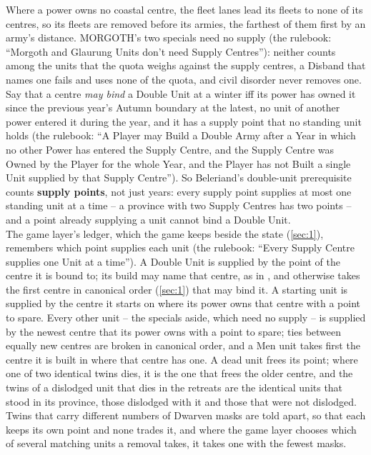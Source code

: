 \documentclass[12pt,a4paper]{article}
\begin{document}
Where a power owns no coastal centre, the fleet lanes lead its fleets to none of its centres, so its fleets are removed before its armies, the farthest of them first by an army's distance.
MORGOTH's two specials need no supply (the rulebook: ``Morgoth and Glaurung Units don't need Supply Centres''): neither counts among the units that the quota weighs against the supply centres, a Disband that names one fails and uses none of the quota, and civil disorder never removes one.\\
Say that a centre \emph{may bind} a Double Unit at a winter iff its power has owned it since the previous year's Autumn boundary at the latest, no unit of another power entered it during the year, and it has a supply point that no standing unit holds (the rulebook: ``A Player may Build a Double Army after a Year in which no other Power has entered the Supply Centre, and the Supply Centre was Owned by the Player for the whole Year, and the Player has not Built a single Unit supplied by that Supply Centre'').
So Beleriand's double-unit prerequisite counts \textbf{supply points}, not just years: every supply point supplies at most one standing unit at a time -- a province with two Supply Centres has two points -- and a point already supplying a unit cannot bind a Double Unit.\\
The game layer's ledger, which the game keeps beside the state (\cref{sec:1}), remembers which point supplies each unit (the rulebook: ``Every Supply Centre supplies one Unit at a time'').
A Double Unit is supplied by the point of the centre it is bound to; its build may name that centre, as in , and otherwise takes the first centre in canonical order (\cref{sec:1}) that may bind it.
A starting unit is supplied by the centre it starts on where its power owns that centre with a point to spare.
Every other unit -- the specials aside, which need no supply -- is supplied by the newest centre that its power owns with a point to spare; ties between equally new centres are broken in canonical order, and a Men unit takes first the centre it is built in where that centre has one.
A dead unit frees its point; where one of two identical twins dies, it is the one that frees the older centre, and the twins of a dislodged unit that dies in the retreats are the identical units that stood in its province, those dislodged with it and those that were not dislodged.
Twins that carry different numbers of Dwarven masks are told apart, so that each keeps its own point and none trades it, and where the game layer chooses which of several matching units a removal takes, it takes one with the fewest masks.
\end{document}
